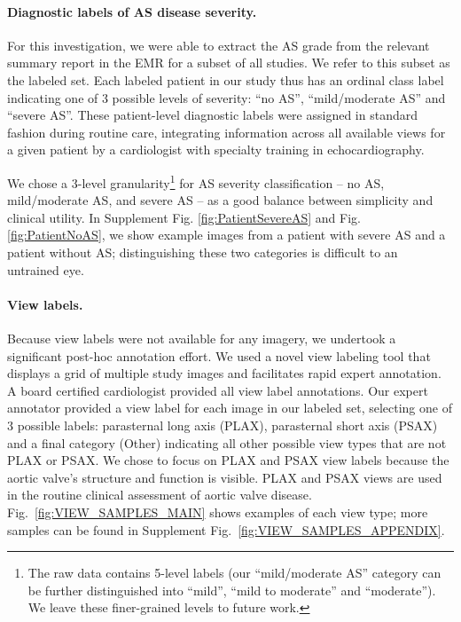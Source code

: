 \paragraph{Diagnostic labels of AS disease severity.}
For this investigation, we were able to extract the AS grade from the relevant summary report in the EMR for a subset of all studies. We refer to this subset as the labeled set.
Each labeled patient in our study thus has an ordinal class label indicating one of 3 possible levels of severity: ``no AS'', ``mild/moderate AS'' and ``severe AS''. 
These patient-level diagnostic labels were assigned in standard fashion during routine care, integrating information across all available views for a given patient by a cardiologist with specialty training in echocardiography. 

We chose a 3-level granularity\footnote{
The raw data contains 5-level labels (our ``mild/moderate AS'' category can be further distinguished into ``mild'', ``mild to moderate'' and ``moderate''). We leave these finer-grained levels to future work.
} for AS severity classification -- no AS, mild/moderate AS, and severe AS --
as a good balance between simplicity and clinical utility.
In Supplement Fig. \ref{fig:PatientSevereAS} and Fig. \ref{fig:PatientNoAS}, we show example images from a patient with severe AS and a patient without AS; distinguishing these two categories is difficult to an untrained eye.



\paragraph{View labels.}
Because view labels were not available for any imagery, we undertook a significant post-hoc annotation effort.
We used a novel view labeling tool that displays a grid of multiple study images and facilitates rapid expert annotation. 
A board certified cardiologist provided all view label annotations.
Our expert annotator provided a view label for each image in our labeled set, selecting one of 3 possible labels: parasternal long axis (PLAX), parasternal short axis (PSAX) and a final category (Other) indicating all other possible view types that are not PLAX or PSAX.
We chose to focus on PLAX and PSAX view labels because the aortic valve's structure and function is visible. PLAX and PSAX views are used in the routine clinical assessment of aortic valve disease.
Fig.~\ref{fig:VIEW_SAMPLES_MAIN} shows examples of each view type; more samples can be found in Supplement Fig.~\ref{fig:VIEW_SAMPLES_APPENDIX}.


